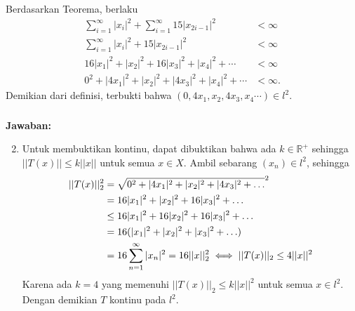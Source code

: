 \documentclass[aspectratio=169]{beamer}
\theoremstyle{definition}
\begin{document}
\begin{frame}
  \frametitle{\insertsection}
  \framesubtitle{\insertsubsection}
  Berdasarkan Teorema, berlaku
    \begin{align*}
        \sum_{i=1}^\infty|x_i|^2+\sum_{i=1}^\infty15|x_{2i-1}|^2&<\infty\\
        \sum_{i=1}^\infty|x_i|^2+15|x_{2i-1}|^2&<\infty\\
        16|x_1|^2+|x_2|^2+16|x_3|^2+|x_4|^2+\cdots&<\infty\\
        0^2+|4x_1|^2+|x_2|^2+|4x_3|^2+|x_4|^2+\cdots&<\infty.
    \end{align*}
    Demikian dari definisi, terbukti bahwa $(0,4x_1,x_2,4x_3,x_4\cdots)\in l^2.$
\end{frame}

\begin{frame}
  \frametitle{\insertsection}
  \framesubtitle{\insertsubsection}
  \textbf{Jawaban:}
  \begin{enumerate}
      \setcounter{enumi}{1}
      \item Untuk membuktikan kontinu, dapat dibuktikan bahwa ada $k \in \mathbb{R}^+$ sehingga $||T(x)||\leq k||x||$ untuk semua $x\in X$. Ambil sebarang $(x_n)\in l^2$, sehingga
    \begin{align*}
        ||T(x)||_2^2
        &=\sqrt{0^2+|4x_1|^2+|x_2|^2+|4x_3|^2+\ldots}^2 \notag \\
        &=16|x_1|^2+|x_2|^2+16|x_3|^2+\ldots \notag \\
        &\leq 16|x_1|^2+16|x_2|^2+16|x_3|^2+\ldots \notag \\
        &=16(|x_1|^2+|x_2|^2+|x_3|^2+\ldots) \notag \\
        &=16\sum_{n=1}^\infty|x_n|^2 =16||x||_2^2 \iff ||T(x)||_2 \leq 4||x||^2 \notag
    \end{align*}
    Karena ada $k=4$ yang memenuhi $||T(x)||_2 \leq k||x||^2$ untuk semua $x \in l^2$. Dengan demikian $T$ kontinu pada $l^2.$
    \end{enumerate}
\end{frame}
\end{document}
